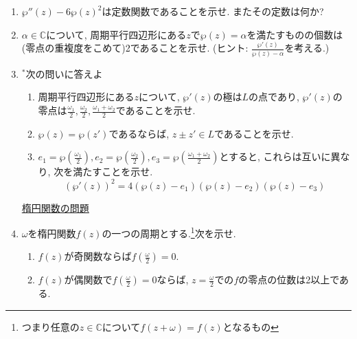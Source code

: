 \documentclass[dvipdfmx,a4paper,11pt]{article}
\newcommand{\C}{\mathbb{C}}
\theoremstyle{definition}
\begin{document}
\begin{enumerate}[label=\textbf{問}5.\arabic*]
 \item $\wp''(z) - 6 \wp(z)^2$は定数関数であることを示せ. またその定数は何か?
 \item $\alpha \in \C$について, 周期平行四辺形にある$z$で$\wp(z)=\alpha$を満たすものの個数は(零点の重複度をこめて)2であることを示せ. (ヒント: $\frac{\wp'(z)}{\wp(z) - \alpha}$を考える.)
 
 \item $^{*}$次の問いに答えよ
 \begin{enumerate}
 \item 周期平行四辺形にある$z$について, $\wp'(z)$の極は$L$の点であり, $\wp'(z)$の零点は$ \frac{\omega_1}{2},  \frac{\omega_2}{2},  \frac{\omega_1+\omega_2}{2}$であることを示せ.
 \item $\wp(z)=\wp(z')$であるならば, $z \pm z' \in L$であることを示せ.
 \item $e_1 = \wp(\frac{\omega_1}{2}), e_2 = \wp(\frac{\omega_2}{2}), e_3 = \wp( \frac{\omega_1+\omega_2}{2})$とすると, これらは互いに異なり, 次を満たすことを示せ.
 $$
  (\wp'(z))^2 = 4 (\wp(z)-e_1)(\wp(z)-e_2)(\wp(z)-e_3)
 $$
 \end{enumerate}

\vspace{12pt}
\hspace{-24pt}\underline{楕円関数の問題}

  \item $\omega$を楕円関数$f(z)$の一つの周期とする.\footnote{つまり任意の$z \in \C$について$f(z + \omega) = f(z)$となるもの}次を示せ. 
\begin{enumerate}
\setlength{\parskip}{0cm} 
  \setlength{\itemsep}{0cm} 
 \item $f(z)$が奇関数ならば$f(\frac{\omega}{2})=0$.
 \item $f(z)$が偶関数で$f(\frac{\omega}{2})=0$ならば, $z = \frac{\omega}{2}$での$f$の零点の位数は2以上である. 
      \end{enumerate}  
   
   
   \newpage
   

\end{enumerate}
\end{document}
